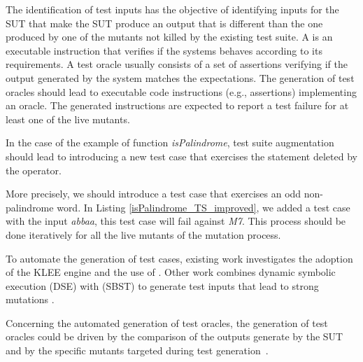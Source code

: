 The identification of test inputs has the objective of identifying inputs for the SUT that make the SUT produce an output that is different than the one produced by one of the mutants not killed by the existing test suite. 
A  is an executable instruction that verifies if the systems behaves according to its requirements. 
A test oracle usually consists of a set of assertions verifying if the output generated by the system matches the expectations.
The generation of test oracles should lead to executable code instructions (e.g., assertions) implementing an oracle. The generated instructions are expected to report a test failure for at least one of the live mutants.


In the case of the example of function \textit{isPalindrome}, test suite augmentation should lead to introducing a new test case that exercises the statement deleted by the operator. 



More precisely, we should introduce a test case that exercises an odd non-palindrome word. In Listing \ref{isPalindrome_TS_improved}, we added a test case with the input \textit{abbaa}, this test case will fail against \textit{M7}. This process should be done iteratively for all the live mutants of the mutation process. 
 

To automate the generation of test cases, existing work investigates the adoption of the KLEE  engine \cite{holling2016nequivack} and the use of  \cite{riener2011test}. Other work combines dynamic symbolic execution (DSE) with  (SBST) to generate test inputs that lead to strong mutations \cite{harman2011strong}. 


Concerning the automated generation of test oracles, 
the generation of test oracles could be driven by the comparison of the outputs generate by the SUT and by the specific mutants targeted during test generation~\cite{Staats2012}.

